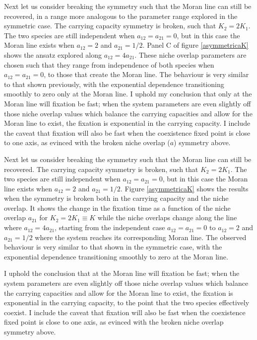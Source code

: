 Next let us consider breaking the symmetry such that the Moran line can still be recovered, in a range more analogous to the parameter range explored in the symmetric case. 
The carrying capacity symmetry is broken, such that $K_2 = 2 K_1$. 
The two species are still independent when $a_{12}=a_{21}=0$, but in this case the Moran line exists when $a_{12} = 2$ and $a_{21} = 1/2$. 
Panel C of figure \ref{asymmetricaK} shows the ansatz explored along $a_{12}=4 a_{21}$. %
These niche overlap parameters are chosen such that they range from independence of both species when $a_{12} = a_{21} = 0$, to those that create the Moran line. %
The behaviour is very similar to that shown previously, with the exponential dependence transitioning smoothly to zero only at the Moran line. 
I uphold my conclusion that only at the Moran line will fixation be fast; when the system parameters are even slightly off those niche overlap values which balance the carrying capacities and allow for the Moran line to exist, the fixation is exponential in the carrying capacity. %
I include the caveat that fixation will also be fast when the coexistence fixed point is close to one axis, as evinced with the broken niche overlap ($a$) symmetry above. 
\fi

Next let us consider breaking the symmetry such that the Moran line can still be recovered.
The carrying capacity symmetry is broken, such that $K_2 = 2 K_1$.
The two species are still independent when $a_{12}=a_{21}=0$, but in this case the Moran line exists when $a_{12} = 2$ and $a_{21} = 1/2$.
Figure \ref{asymmetricaK} shows the results when the symmetry is broken both in the carrying capacity and the niche overlap.
It shows the change in the fixation time as a function of the niche overlap $a_{21}$ for $K_2=2K_1\equiv K$ while the niche overlaps change along the line where $a_{12}=4 a_{21}$, starting from the independent case $a_{12}=a_{21}=0$ to $a_{12} = 2$ and $a_{21} = 1/2$ where the system reaches its corresponding Moran line.
The observed behaviour is very similar to that shown in the symmetric case, with the exponential dependence transitioning smoothly to zero at the Moran line.

I uphold the conclusion that at the Moran line will fixation be fast; when the system parameters are even slightly off those niche overlap values which balance the carrying capacities and allow for the Moran line to exist, the fixation is exponential in the carrying capacity, to the point that the two species effectively coexist. 
I include the caveat that fixation will also be fast when the coexistence fixed point is close to one axis, as evinced with the broken niche overlap symmetry above. 


